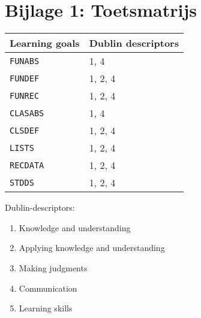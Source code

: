 \section*{Bijlage 1: Toetsmatrijs}
	\begin{tabular}{|p{2cm}|p{4cm}|}
		\hline
		Learning goals & Dublin descriptors \\
		\hline
		\texttt{FUNABS} & 1, 4 \\
		\hline
		\texttt{FUNDEF} & 1, 2, 4 \\
		\hline
		\texttt{FUNREC} & 1, 2, 4 \\
		\hline
		\texttt{CLASABS} & 1, 4 \\
		\hline
		\texttt{CLSDEF} & 1, 2, 4 \\
		\hline
		\texttt{LISTS} & 1, 2, 4 \\
		\hline
		\texttt{RECDATA} & 1, 2, 4 \\
		\hline
		\texttt{STDDS} & 1, 2, 4 \\
		\hline
	\end{tabular}
	
	\vspace{1cm}

	Dublin-descriptors:
	\begin{enumerate}
		\item Knowledge and understanding
		\item Applying knowledge and understanding
		\item Making judgments
		\item Communication
		\item Learning skills
	\end{enumerate}
